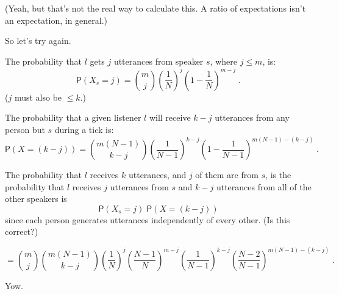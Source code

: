 \documentclass[12pt]{article}
\newcommand{\pr}{\mathsf{P}} %
\newcommand{\comb}[2]{{{#1}\choose{#2}}}
\begin{document}
(Yeah, but that's not the real way to calculate this.  A ratio of
expectations isn't an expectation, in general.)

\vspace{3ex}

So let's try again.

The probability that $l$ gets $j$ utterances from speaker $s$,
where $j\leq m$, is:
\[
    \pr(X_s=j) = \comb{m}{j} \left(\frac{1}{N}\right)^j
    \left(1-\frac{1}{N}\right)^{m-j} \;.
\]
($j$ must also be $\leq k$.)

The probability that a given listener $l$ will receive $k-j$
utterances from any person but $s$ during a tick is:
\[
    \pr(X=(k-j)) = \comb{m(N-1)}{k-j}
    \left(\frac{1}{N-1}\right)^{k-j}
    \left(1-\frac{1}{N-1}\right)^{m(N-1)-(k-j)} \;.
\]

The probability that $l$ receives $k$ utterances, and $j$ of
them are from $s$, is the probability that $l$ receives $j$
utterances from $s$ and $k-j$ utterances from all of the other
speakers is 
\[
\pr(X_s=j) \; \pr(X=(k-j)) 
\]
since each person generates utterances independently of every
other. (Is this correct?)

\[
    = 
    \comb{m}{j}\comb{m(N-1)}{k-j}
    \left(\frac{1}{N}\right)^j
    \left(\frac{N-1}{N}\right)^{m-j}
    \left(\frac{1}{N-1}\right)^{k-j}
    \left(\frac{N-2}{N-1}\right)^{m(N-1)-(k-j)} \;.
\]

Yow.
\end{document}
